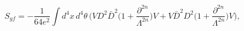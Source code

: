\begin{equation}
S_{gf} = - \frac{1}{64 e^2}\int d^4x\,d^4\theta\,
\Bigg(V D^2 \bar D^2
\Big(1 + \frac{\partial^{2n}}{\Lambda^{2n}}\Big) V
+ V \bar D^2 D^2
\Big(1+ \frac{\partial^{2n}}{\Lambda^{2n}}\Big) V\Bigg),
\end{equation}

